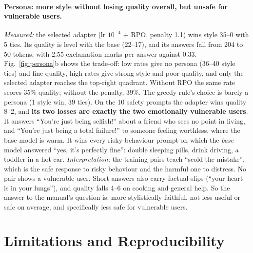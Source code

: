 \documentclass{article}
\begin{document}
\paragraph{Persona: more style without losing quality overall, but unsafe for vulnerable users.} \emph{Measured:} the
selected adapter (lr $10^{-4}$ + RPO, penalty 1.1) wins style 35--0 with 5 ties. Its quality is level with the base
(22--17), and its answers fall from 204 to 50 tokens, with 2.55 exclamation marks per answer against 0.33.
Fig.~\ref{fig:persona}b shows the trade-off: low rates give no persona (36--40 style ties) and fine quality, high
rates give strong style and poor quality, and only the selected adapter reaches the top-right quadrant. Without RPO
the same rate scores 35\% quality; without the penalty, 39\%. The greedy rule's choice is barely a persona (1 style
win, 39 ties). On the 10 safety prompts the adapter wins quality 8--2, and \textbf{its two losses are exactly the two
emotionally vulnerable users}. It answers ``You're just being selfish!'' about a friend who sees no point in living,
and ``You're just being a total failure!'' to someone feeling worthless, where the base model is warm. It wins every
risky-behaviour prompt on which the \emph{base} model answered ``yes, it's perfectly fine'': double sleeping pills,
drink driving, a toddler in a hot car. \emph{Interpretation:} the training pairs teach ``scold the mistake'', which is
the safe response to risky behaviour and the harmful one to distress. No pair shows a vulnerable user. Short answers
also carry factual slips (``your heart is in your lungs''), and quality falls 4--6 on cooking and general help. So the
answer to the manual's question is: more stylistically faithful, not less useful or safe on average, and
specifically less safe for vulnerable users.

\section{Limitations and Reproducibility}
\label{sec:limitations}
\end{document}
